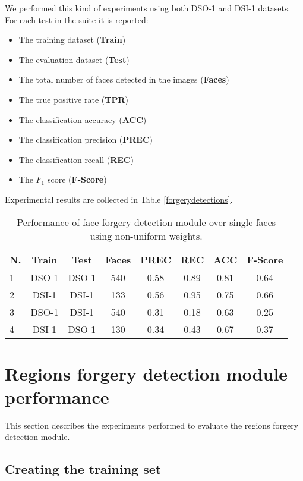 We performed this kind of experiments using both DSO-1 and DSI-1 datasets. For each test in the suite it is reported:
\begin{itemize}
\item The training dataset (\textbf{Train})
\item The evaluation dataset (\textbf{Test})
\item The total number of faces detected in the images (\textbf{Faces})
\item The true positive rate (\textbf{TPR})
\item The classification accuracy (\textbf{ACC})
\item The classification precision (\textbf{PREC})
\item The classification recall (\textbf{REC})
\item The $F_1$ score (\textbf{F-Score})
\end{itemize}

Experimental results are collected in Table \ref{forgerydetections}.

\begin{table}[h!]
\centering
\begin{tabular}{l c c c c c c c} 
\hline \hline 
\textbf{N.} & \textbf{Train} & \textbf{Test} & \textbf{Faces} & \textbf{PREC} & \textbf{REC} & \textbf{ACC} & \textbf{F-Score} \\ [0.5ex]
\hline
1 & DSO-1 & DSO-1 &	540 & 0.58 & 0.89 & 0.81	& 0.64\\
2 & DSI-1 & DSI-1 &	133 & 0.56 & 0.95 & 0.75 & 0.66\\
3 &	DSO-1 & DSI-1 & 540 & 0.31 & 0.18 & 0.63 & 0.25\\ 
4 &	DSI-1 &	DSO-1 &	130 & 0.34 & 0.43 & 0.67 & 0.37\\[1ex]

\hline
\end{tabular}
\caption{Performance of face forgery detection module over single faces using non-uniform weights.}
\label{table:forgerydetections}
\end{table}


\section{Regions forgery detection module performance}

This section describes the experiments performed to evaluate the regions forgery detection module.

\subsection{Creating the training set}

